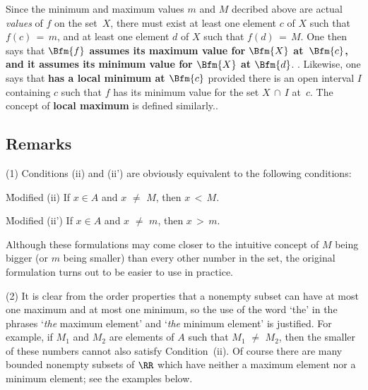         Since the minimum and maximum values $m$ and $M$ decribed above are actual {\em values} of $f$ on the set~$X$,
    there must exist at least one element $c$ of $X$ such that $f(c) \,=\, m$, and at least one element $d$ of $X$ such that $f(d) \,=\, M$.
    One then says that {\bf $\Bfm{f}$ assumes its maximum value for $\Bfm{X}$ at~$\Bfm{c}$, and it assumes its minimum value for $\Bfm{X}$ at $\Bfm{d}$}.
    .
    Likewise, one says that {\bf {} has a local minimum at $\Bfm{c}$} provided 
    there is an open interval $I$ containing $c$ such that $f$ has its minimum value for the set $X\,{\cap}\,I$ at~$c$.
    The concept of {\bf local maximum} is defined similarly..

\VV

            \subsection{\small{\bf Remarks}}
            \label{RemrkB30.70}

\V

\hspace*{\parindent} (1) Conditions (ii) and (ii') are obviously equivalent to the following conditions:

        \h Modified (ii) If $x{\in}A$ and $x \,\,{\neq}\,\, M$, then $x\,<\,M$.

        \h Modified (ii') If $x{\in}A$ and $x \,\,{\neq}\,\, m$, then $x\,>\,m$.

\noindent Although these formulations may come closer to the intuitive concept of $M$ being bigger (or $m$ being smaller) than every other number in the set,
    the original formulation turns out to be easier to use in practice.

\V

      (2) It is clear from the order properties that a nonempty subset can have at most one maximum and at most one minimum,
    so the use of the word `the' in the phrases `{\em the} maximum element' and `{\em the} minimum element' is justified.
    For example, if $M_{1}$ and $M_{2}$ are elements of $A$ such that $M_{1} \,\,{\neq}\,\, M_{2}$,
    then the smaller of these numbers cannot also satisfy Condition~(ii).
    Of course there are many bounded nonempty subsets of ${\RR}$ which have neither a maximum element nor a minimum element; see the examples below.

\V


